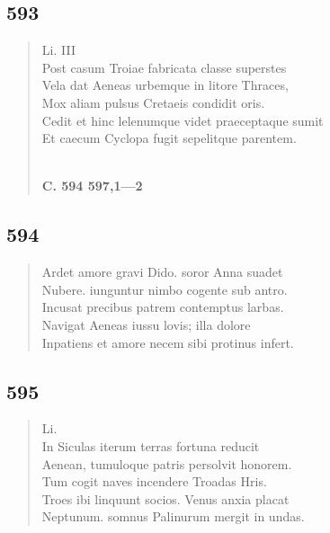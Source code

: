 \documentclass[11pt, a4paper]{report}
\begin{document}
            \subsection*{593}
      \begin{verse}
      Li. III \\ Post casum Troiae fabricata classe superstes \\ Vela dat Aeneas urbemque in litore Thraces, \\ Mox aliam pulsus Cretaeis condidit oris. \\ Cedit et hinc lelenumque videt praeceptaque sumit \\ Et caecum Cyclopa fugit sepelitque parentem. \\ 
        ﻿\pagebreak 
    \begin{center} \textbf{C. 594 597,1—2} \end{center} \marginpar{[84]} 
      \end{verse}
  
            \subsection*{594}
      \begin{verse}
      Ardet amore gravi Dido. soror Anna suadet \\ Nubere. iunguntur nimbo cogente sub antro. \\ Incusat precibus patrem contemptus larbas. \\ Navigat Aeneas iussu lovis; illa dolore \\ Inpatiens et amore necem sibi protinus infert. \\ 
      \end{verse}
  
            \subsection*{595}
      \begin{verse}
      Li. \\ In Siculas iterum terras fortuna reducit \\ Aenean, tumuloque patris persolvit honorem. \\ Tum cogit naves incendere Troadas Hris. \\ Troes ibi linquunt socios. Venus anxia placat \\ Neptunum. somnus Palinurum mergit in undas. \\ 
      \end{verse}
  
\end{document}
